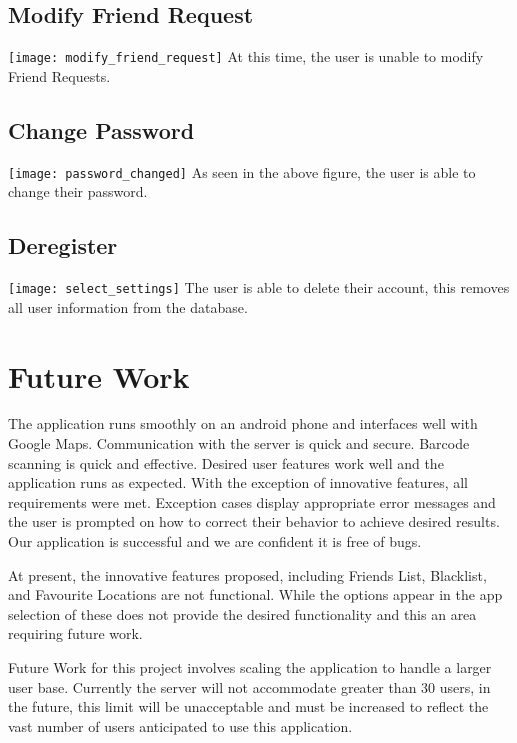 \documentclass[english]{article}
\begin{document}
\subsection{Modify Friend Request}
\texttt{[image: modify\_friend\_request]}
At this time, the user is unable to modify Friend Requests. 

\subsection{Change Password}
\texttt{[image: password\_changed]}
\newline 
As seen in the above figure, the user is able to change their password. 

\subsection{Deregister}
\texttt{[image: select\_settings]}
\newline
The user is able to delete their account, this removes all user information from the database.

\section{Future Work}
\label{sec:future_work}
The application runs smoothly on an android phone and interfaces well with Google Maps. Communication with the server is quick and secure. Barcode scanning is quick and effective. Desired user features work well and the application runs as expected. With the exception of innovative features, all requirements were met. Exception cases display appropriate error messages and the user is prompted on how to correct their behavior to achieve desired results. Our application is successful and we are confident it is free of bugs. 

\smallskip
At present, the innovative features proposed, including Friends List, Blacklist, and Favourite Locations are not functional. While the options appear in the app selection of these does not provide the desired functionality and this an area requiring future work.

\smallskip
Future Work for this project involves scaling the application to handle a larger user base. Currently the server will not accommodate greater than 30 users, in the future, this limit will be unacceptable and must be increased to reflect the vast number of users anticipated to use this application. 
\end{document}
